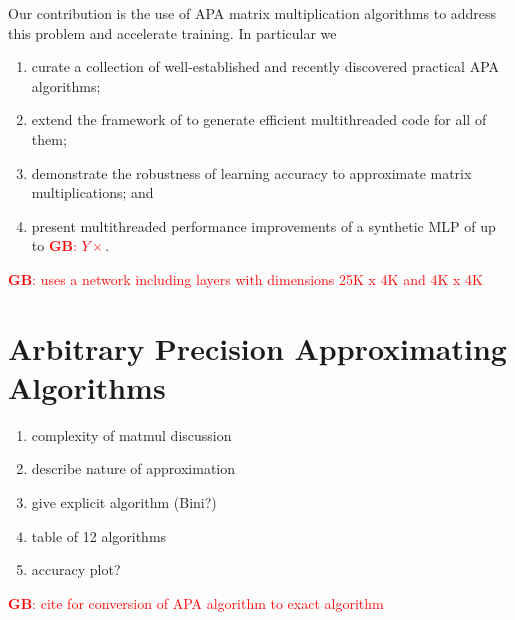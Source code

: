 \documentclass[conference]{IEEEtran}
\newcommand{\GB}[1]{\textcolor{red}{\textbf{GB}: #1}}
\begin{document}
Our contribution is the use of APA matrix multiplication algorithms to address this problem and accelerate training.
In particular we
\begin{enumerate}
	\item curate a collection of well-established and recently discovered practical APA algorithms;
	\item extend the framework of \cite{BB15} to generate efficient multithreaded code for all of them;
	\item demonstrate the robustness of learning accuracy to approximate matrix multiplications; and
	\item present multithreaded performance improvements of a synthetic MLP of up to \GB{$Y\times$}.
\end{enumerate}

\GB{\cite{NPOV15} uses a network including layers with dimensions 25K x 4K and 4K x 4K}

\section{Arbitrary Precision Approximating Algorithms}
\label{sec:APA}

\begin{enumerate}
	\item complexity of matmul discussion
	\item describe nature of approximation
	\item give explicit algorithm (Bini?)
	\item table of 12 algorithms
	\item accuracy plot?
\end{enumerate}



\GB{cite \cite{Bini80} for conversion of APA algorithm to exact algorithm}
\end{document}

